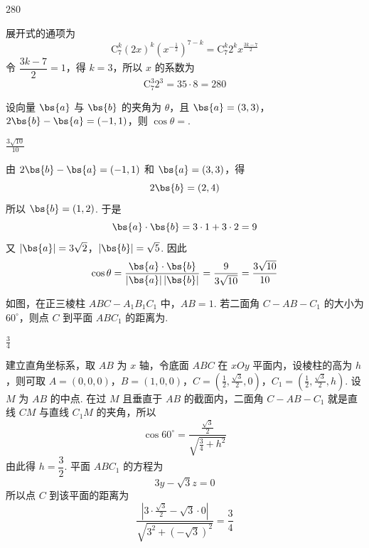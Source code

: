 \begin{answer}
\(280\)
\end{answer}

\begin{solution}
展开式的通项为
\[
\mathrm C_{7}^{k}(2x)^{k}\left(x^{-\frac12}\right)^{7-k}=\mathrm C_{7}^{k}2^{k}x^{\frac{3k-7}{2}}
\]
令 \(\dfrac{3k-7}{2}=1\)，得 \(k=3\)，所以 \(x\) 的系数为
\[
\mathrm C_{7}^{3}2^{3}=35\cdot8=280
\]
\end{solution}

\begin{problem}
设向量 \(\bs{a}\) 与 \(\bs{b}\) 的夹角为 \(\theta\)，且 \(\bs{a}=(3,3)\)，\(2\bs{b}-\bs{a}=(-1,1)\)，则 \(\cos\theta=\)\fillinblank{}.
\end{problem}

\begin{answer}
\(\frac{3\sqrt{10}}{10}\)
\end{answer}

\begin{solution}
由 \(2\bs{b}-\bs{a}=(-1,1)\) 和 \(\bs{a}=(3,3)\)，得
\[
2\bs{b}=(2,4)
\]
所以 \(\bs{b}=(1,2)\). 于是
\[
\bs{a}\cdot\bs{b}=3\cdot1+3\cdot2=9
\]
又 \(|\bs{a}|=3\sqrt2\)，\(|\bs{b}|=\sqrt5\).
因此
\[
\cos\theta=\frac{\bs{a}\cdot\bs{b}}{|\bs{a}|\,|\bs{b}|}=\frac{9}{3\sqrt{10}}=\frac{3\sqrt{10}}{10}
\]
\end{solution}

\begin{problem}
如图，在正三棱柱 \(ABC-A_{1}B_{1}C_{1}\) 中，\(AB=1\). 若二面角 \(C-AB-C_{1}\) 的大小为 \(60^{\circ}\)，则点 \(C\) 到平面 \(ABC_{1}\) 的距离为\fillinblank{}.

\FloatBarrier
\end{problem}

\begin{answer}
\(\frac{3}{4}\)
\end{answer}

\begin{solution}
建立直角坐标系，取 \(AB\) 为 \(x\) 轴，令底面 \(ABC\) 在 \(xOy\) 平面内，设棱柱的高为 \(h\)，则可取
\(A=(0,0,0)\)，\(B=(1,0,0)\)，\(C=\left(\frac12,\frac{\sqrt3}{2},0\right)\)，\(C_{1}=\left(\frac12,\frac{\sqrt3}{2},h\right)\).
设 \(M\) 为 \(AB\) 的中点. 在过 \(M\) 且垂直于 \(AB\) 的截面内，二面角 \(C-AB-C_{1}\) 就是直线 \(CM\) 与直线 \(C_{1}M\) 的夹角，所以
\[
\cos60^{\circ}=\frac{\frac{\sqrt3}{2}}{\sqrt{\frac34+h^{2}}}
\]
由此得 \(h=\dfrac32\). 平面 \(ABC_{1}\) 的方程为
\[
3y-\sqrt3z=0
\]
所以点 \(C\) 到该平面的距离为
\[
\frac{\left|3\cdot\frac{\sqrt3}{2}-\sqrt3\cdot0\right|}{\sqrt{3^{2}+\left(-\sqrt3\right)^{2}}}=\frac34
\]
\end{solution}


